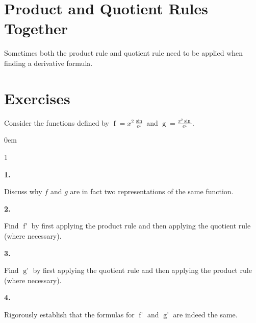\documentclass[12pt,]{book}
\theoremstyle{plain}
\theoremstyle{definition}
\numberwithin{equation}{section}
\newenvironment{exercisegroup}%
{\medskip\noindent}%
{\par\bigskip}%
\newlength{\exercisegroupindent}%
\newlength{\exercisegroupitemwidth}%
\newenvironment{exercisegrouplist}%
{\vspace{-\partopsep}%
\begin{adjustwidth}{\exercisegroupindent}{0em}}%
{\end{adjustwidth}%
\vspace{-\partopsep}%
\vspace{\baselineskip}}%
\newenvironment{exercisegroupbycol}[1]%
{\begin{exercisegrouplist}%
\vspace{-\multicolsep}%
\begin{multicols}{#1}%
\setlength{\parindent}{0em}%
\setlength{\exercisegroupitemwidth}{\linewidth}}%
{\end{multicols}%
\vspace{-\multicolsep}%
\end{exercisegrouplist}}%
\newenvironment{exercisegroupitem}[1]%
{\begin{minipage}[t]{\exercisegroupitemwidth}
\vspace{0pt}%
{\bfseries#1}%
\rule{0pt}{\baselineskip}}{\strut%
\end{minipage}%
\hspace{\columnsep}}%
\providecommand\phantomsection{}
\newcommand{\fe}[2]{\mathop{{#1}{\left(#2\right)}}}
\newcommand{\fd}[1]{#1'}
\begin{document}
\section[Product and Quotient Rules Together]{Product and Quotient Rules Together}\label{section-product-and-quotient-together}
Sometimes both the product rule and quotient rule need to be applied when finding a derivative formula.%
\typeout{************************************************}
\typeout{************************************************}
\section*{Exercises}\label{exercises-38}

\begin{exercisegroup}%
Consider the functions defined by \(\fe{f}{x}=x^2\frac{\fe{\sin}{x}}{e^x}\) and \(\fe{g}{x}=\frac{x^2\fe{\sin}{x}}{e^x}\).%
\par
\begin{exercisegroupbycol}{1}%
\begin{exercisegroupitem}{1. }\phantomsection\hypertarget{exercise-327}{\null}
Discuss why \(f\) and \(g\) are in fact two representations of the same function.%
\end{exercisegroupitem}%
\par%
\begin{exercisegroupitem}{2. }\phantomsection\hypertarget{exercise-328}{\null}
Find \(\fe{\fd{f}}{x}\) by first applying the product rule and then applying the quotient rule (where necessary).%
\end{exercisegroupitem}%
\par%
\begin{exercisegroupitem}{3. }\phantomsection\hypertarget{exercise-329}{\null}
Find \(\fe{\fd{g}}{x}\) by first applying the quotient rule and then applying the product rule (where necessary).%
\end{exercisegroupitem}%
\par%
\begin{exercisegroupitem}{4. }\phantomsection\hypertarget{exercise-330}{\null}
Rigorously establish that the formulas for \(\fe{\fd{f}}{x}\) and \(\fe{\fd{g}}{x}\) are indeed the same.%
\end{exercisegroupitem}%
\par%
\end{exercisegroupbycol}%
\end{exercisegroup}%
\typeout{************************************************}
\typeout{************************************************}
\end{document}
